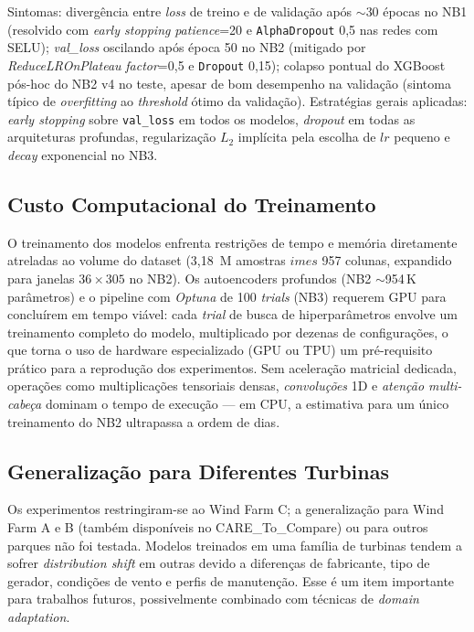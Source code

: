 \documentclass[12pt]{article}
\begin{document}
Sintomas: divergência entre \textit{loss} de treino e de validação após $\sim$30 épocas no NB1 (resolvido com \textit{early stopping} \textit{patience}=20 e \texttt{AlphaDropout} 0,5 nas redes com SELU); \textit{val\_loss} oscilando após época 50 no NB2 (mitigado por \textit{ReduceLROnPlateau} \textit{factor}=0,5 e \texttt{Dropout} 0,15); colapso pontual do XGBoost pós-hoc do NB2 v4 no teste, apesar de bom desempenho na validação (sintoma típico de \textit{overfitting} ao \textit{threshold} ótimo da validação). Estratégias gerais aplicadas: \textit{early stopping} sobre \texttt{val\_loss} em todos os modelos, \textit{dropout} em todas as arquiteturas profundas, regularização $L_2$ implícita pela escolha de $lr$ pequeno e \textit{decay} exponencial no NB3.

\subsection{Custo Computacional do Treinamento}

O treinamento dos modelos enfrenta restrições de tempo e memória diretamente atreladas ao volume do dataset (3,18~M amostras $	imes$ 957 colunas, expandido para janelas $36 \times 305$ no NB2). Os autoencoders profundos (NB2 $\sim$954\,K parâmetros) e o pipeline com \emph{Optuna} de 100 \emph{trials} (NB3) requerem GPU para concluírem em tempo viável: cada \emph{trial} de busca de hiperparâmetros envolve um treinamento completo do modelo, multiplicado por dezenas de configurações, o que torna o uso de hardware especializado (GPU ou TPU) um pré-requisito prático para a reprodução dos experimentos. Sem aceleração matricial dedicada, operações como multiplicações tensoriais densas, \emph{convoluções} 1D e \emph{atenção multi-cabeça} dominam o tempo de execução --- em CPU, a estimativa para um único treinamento do NB2 ultrapassa a ordem de dias.

\subsection{Generalização para Diferentes Turbinas}

Os experimentos restringiram-se ao Wind Farm C; a generalização para Wind Farm A e B (também disponíveis no CARE\_To\_Compare) ou para outros parques não foi testada. Modelos treinados em uma família de turbinas tendem a sofrer \textit{distribution shift} em outras devido a diferenças de fabricante, tipo de gerador, condições de vento e perfis de manutenção. Esse é um item importante para trabalhos futuros, possivelmente combinado com técnicas de \textit{domain adaptation}.
\end{document}
